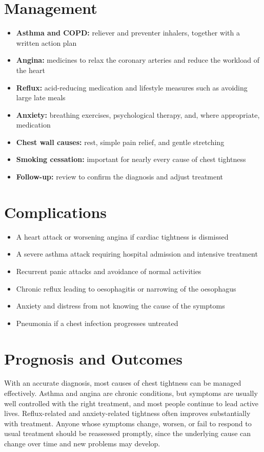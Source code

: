 \section*{Management}
\begin{itemize}
    \item \textbf{Asthma and COPD:} reliever and preventer inhalers, together with a written action plan
    \item \textbf{Angina:} medicines to relax the coronary arteries and reduce the workload of the heart
    \item \textbf{Reflux:} acid-reducing medication and lifestyle measures such as avoiding large late meals
    \item \textbf{Anxiety:} breathing exercises, psychological therapy, and, where appropriate, medication
    \item \textbf{Chest wall causes:} rest, simple pain relief, and gentle stretching
    \item \textbf{Smoking cessation:} important for nearly every cause of chest tightness
    \item \textbf{Follow-up:} review to confirm the diagnosis and adjust treatment
\end{itemize}

\section*{Complications}
\begin{itemize}
    \item A heart attack or worsening angina if cardiac tightness is dismissed
    \item A severe asthma attack requiring hospital admission and intensive treatment
    \item Recurrent panic attacks and avoidance of normal activities
    \item Chronic reflux leading to oesophagitis or narrowing of the oesophagus
    \item Anxiety and distress from not knowing the cause of the symptoms
    \item Pneumonia if a chest infection progresses untreated
\end{itemize}

\section*{Prognosis and Outcomes}
With an accurate diagnosis, most causes of chest tightness can be managed effectively. Asthma and angina are chronic conditions, but symptoms are usually well controlled with the right treatment, and most people continue to lead active lives. Reflux-related and anxiety-related tightness often improves substantially with treatment. Anyone whose symptoms change, worsen, or fail to respond to usual treatment should be reassessed promptly, since the underlying cause can change over time and new problems may develop.

